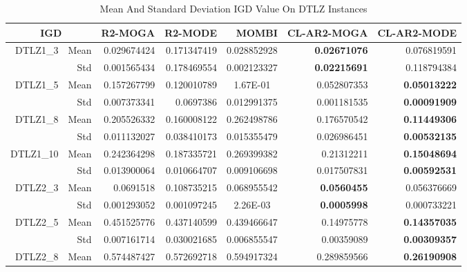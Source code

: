 \begin{table*}[htbp]
  \centering
  \caption{Mean And Standard Deviation IGD Value On DTLZ Instances}
    \begin{tabular}{rrrrrrr}
    \toprule
    \multicolumn{2}{c}{IGD} & R2-MOGA & R2-MODE & MOMBI & CL-AR2-MOGA & CL-AR2-MODE \\
    \midrule
    \multirow{2}[0]{*}{DTLZ1\_3} & Mean  & 0.029674424 & 0.171347419 & \multicolumn{1}{c}{0.028852928} & \textbf{0.02671076} & 0.076819591 \\
          & Std   & 0.001565434 & 0.178469554 & \multicolumn{1}{c}{0.002123327} & \textbf{0.02215691} & 0.118794384 \\
    \multirow{2}[0]{*}{DTLZ1\_5} & Mean  & 0.157267799 & 0.120010789 & \multicolumn{1}{c}{1.67E-01} & 0.052807353 & \textbf{0.05013222} \\
          & Std   & 0.007373341 & 0.0697386 & \multicolumn{1}{c}{0.012991375} & 0.001181535 & \textbf{0.00091909} \\
    \multirow{2}[0]{*}{DTLZ1\_8} & Mean  & 0.205526332 & 0.160008122 & \multicolumn{1}{c}{0.262498786} & 0.176570542 & \textbf{0.11449306} \\
          & Std   & 0.011132027 & 0.038410173 & \multicolumn{1}{c}{0.015355479} & 0.026986451 & \textbf{0.00532135} \\
    \multirow{2}[0]{*}{DTLZ1\_10} & Mean  & 0.242364298 & 0.187335721 & \multicolumn{1}{c}{0.269399382} & 0.21312211 & \textbf{0.15048694} \\
          & Std   & 0.013900064 & 0.010664707 & \multicolumn{1}{c}{0.009106698} & 0.017507831 & \textbf{0.00592531} \\
    \multirow{2}[0]{*}{DTLZ2\_3} & Mean  & 0.0691518 & 0.108735215 & \multicolumn{1}{c}{0.068955542} & \textbf{0.0560455} & 0.056376669 \\
          & Std   & 0.001293052 & 0.001097245 & \multicolumn{1}{c}{2.26E-03} & \textbf{0.0005998} & 0.000733221 \\
    \multirow{2}[0]{*}{DTLZ2\_5} & Mean  & 0.451525776 & 0.437140599 & \multicolumn{1}{c}{0.439466647} & 0.14975778 & \textbf{0.14357035} \\
          & Std   & 0.007161714 & 0.030021685 & \multicolumn{1}{c}{0.006855547} & 0.00359089 & \textbf{0.00309357} \\
    \multirow{2}[0]{*}{DTLZ2\_8} & Mean  & 0.574487427 & 0.572692718 & \multicolumn{1}{c}{0.594917324} & 0.289859566 & \textbf{0.26190908} \\

\end{tabular}
\end{table*}

